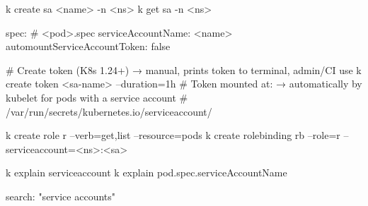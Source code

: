 \begin{tcbitemize}[
  raster columns=3, raster equal height=rows,
  blanker, cheat subtitle
]

  \tcbitem

    \begin{cheatcodebash}
    k create sa <name> -n <ns>
    k get sa -n <ns>
    \end{cheatcodebash}

    \begin{cheatcodebash}
    spec:                  # <pod>.spec
      serviceAccountName: <name>
      automountServiceAccountToken: false
    \end{cheatcodebash}

    \begin{cheatcodebash}
    # Create token (K8s 1.24+) → manual, prints token to terminal, admin/CI use
    k create token <sa-name> --duration=1h
    # Token mounted at: → automatically by kubelet for pods with a service account
    # /var/run/secrets/kubernetes.io/serviceaccount/
    \end{cheatcodebash}

    \begin{cheatcodebashbold}
    k create role r --verb=get,list --resource=pods
    k create rolebinding rb --role=r --serviceaccount=<ns>:<sa>
    \end{cheatcodebashbold}

    \begin{cheatcodebash}
    k explain serviceaccount
    k explain pod.spec.serviceAccountName
    \end{cheatcodebash}


    \begin{cheatcodebash}
    search: "service accounts"
    \end{cheatcodebash}


  \tcbitem[raster multicolumn=2]


    \begin{tcbitemize}[
      raster columns=2, raster equal height=rows,
      blanker, cheat subtitle
]


\end{tcbitemize}
\end{tcbitemize}
